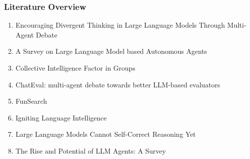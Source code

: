 \documentclass{beamer}
\begin{document}
\begin{frame}
\end{frame}
        

\begin{frame}
\frametitle{Literature Overview}
\begin{enumerate}
    \item Encouraging Divergent Thinking in Large Language Models Through Multi-Agent Debate 
    \item A Survey on Large Language Model based Autonomous Agents
    \item Collective Intelligence Factor in Groups
    \item ChatEval: multi-agent debate towards better LLM-based evaluators
    \item FunSearch
    \item Igniting Language Intelligence
    \item Large Language Models Cannot Self-Correct Reasoning Yet
    \item The Rise and Potential of LLM Agents: A Survey
\end{enumerate}
\end{frame}
\end{document}
